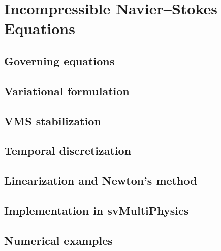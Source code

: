 \chapter{Incompressible Navier--Stokes Equations}
\label{ch:ns}

\section{Governing equations}
\label{sec:ns:governing}


\section{Variational formulation}
\label{sec:ns:variational}


\section{VMS stabilization}
\label{sec:ns:vms}


\section{Temporal discretization}
\label{sec:ns:temporal}


\section{Linearization and Newton's method}
\label{sec:ns:newton}


\section{Implementation in svMultiPhysics}
\label{sec:ns:implementation}


\section{Numerical examples}
\label{sec:ns:examples}

